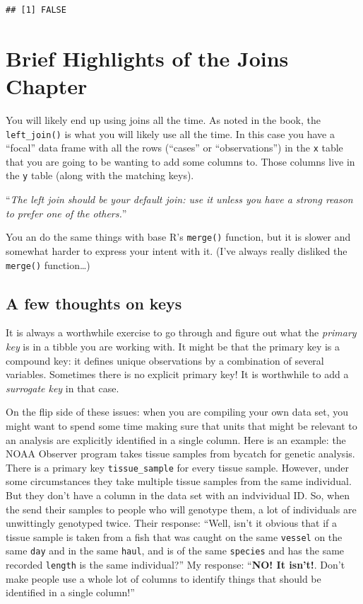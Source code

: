 \documentclass[]{book}
\theoremstyle{definition}
\theoremstyle{definition}
\theoremstyle{remark}
\begin{document}
\begin{verbatim}
## [1] FALSE
\end{verbatim}

\section{Brief Highlights of the Joins
Chapter}\label{brief-highlights-of-the-joins-chapter}

You will likely end up using joins all the time. As noted in the book,
the \texttt{left\_join()} is what you will likely use all the time. In
this case you have a ``focal'' data frame with all the rows (``cases''
or ``observations'') in the \texttt{x} table that you are going to be
wanting to add some columns to. Those columns live in the \texttt{y}
table (along with the matching keys).

``\emph{The left join should be your default join: use it unless you
have a strong reason to prefer one of the others.}''

You an do the same things with base R's \texttt{merge()} function, but
it is slower and somewhat harder to express your intent with it. (I've
always really disliked the \texttt{merge()} function\ldots{})

\subsection{A few thoughts on keys}\label{a-few-thoughts-on-keys}

It is always a worthwhile exercise to go through and figure out what the
\emph{primary key} is in a tibble you are working with. It might be that
the primary key is a compound key: it defines unique observations by a
combination of several variables. Sometimes there is no explicit primary
key! It is worthwhile to add a \emph{surrogate key} in that case.

On the flip side of these issues: when you are compiling your own data
set, you might want to spend some time making sure that units that might
be relevant to an analysis are explicitly identified in a single column.
Here is an example: the NOAA Observer program takes tissue samples from
bycatch for genetic analysis. There is a primary key
\texttt{tissue\_sample} for every tissue sample. However, under some
circumstances they take multiple tissue samples from the same
individual. But they don't have a column in the data set with an
indvividual ID. So, when the send their samples to people who will
genotype them, a lot of individuals are unwittingly genotyped twice.
Their response: ``Well, isn't it obvious that if a tissue sample is
taken from a fish that was caught on the same \texttt{vessel} on the
same \texttt{day} and in the same \texttt{haul}, and is of the same
\texttt{species} and has the same recorded \texttt{length} is the same
individual?'' My response: ``\textbf{NO! It isn't!}. Don't make people
use a whole lot of columns to identify things that should be identified
in a single column!''
\end{document}
